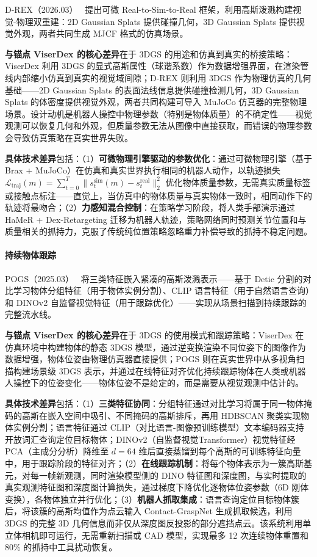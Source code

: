 D-REX（2026.03）~\cite{2603_01151} 提出可微 Real-to-Sim-to-Real 框架，利用高斯泼溅构建视觉-物理双重建：2D Gaussian Splats 提供碰撞几何，3D Gaussian Splats 提供视觉外观，两者共同生成 MJCF 格式的仿真场景。

\textbf{与锚点 ViserDex 的核心差异}在于 3DGS 的用途和仿真到真实的桥接策略：ViserDex 利用 3DGS 的显式高斯属性（球谐系数）作为数据增强界面，在渲染管线内部缩小仿真到真实的视觉域间隙；D-REX 则利用 3DGS 作为物理仿真的几何基础——2D Gaussian Splats 的表面法线信息提供碰撞检测几何，3D Gaussian Splats 的体密度提供视觉外观，两者共同构建可导入 MuJoCo 仿真器的完整物理场景。设计动机是机器人操控中物理参数（特别是物体质量）的不确定性——视觉观测可以恢复几何和外观，但质量参数无法从图像中直接获取，而错误的物理参数会导致仿真策略在真实世界失败。

\textbf{具体技术差异}包括：（1）\textbf{可微物理引擎驱动的参数优化}：通过可微物理引擎（基于 Brax + MuJoCo）在仿真和真实世界执行相同的机器人动作，以轨迹损失 $\mathcal{L}_\text{traj}(m) = \sum_{t=0}^T \|s_t^\text{sim}(m) - s_t^\text{real}\|_2^2$ 优化物体质量参数，无需真实质量标签或接触点标注——直觉上，当仿真中的物体质量与真实物体一致时，相同动作下的轨迹将最吻合；（2）\textbf{力感知混合控制}：在策略学习阶段，将人类手部演示通过 HaMeR + Dex-Retargeting 迁移为机器人轨迹，策略网络同时预测关节位置和与质量相关的抓持力，克服了传统纯位置策略忽略重力补偿导致的抓持不稳定问题。

\paragraph{持续物体跟踪}

POGS（2025.03）~\cite{2503_05189} 将三类特征嵌入紧凑的高斯泼溅表示——基于 Detic 分割的对比学习物体分组特征（用于物体实例分割）、CLIP 语言特征（用于自然语言查询）和 DINOv2 自监督视觉特征（用于跟踪优化）——实现从场景扫描到持续跟踪的完整流水线。

\textbf{与锚点 ViserDex 的核心差异}在于 3DGS 的使用模式和跟踪策略：ViserDex 在仿真环境中构建物体的静态 3DGS 模型，通过逆变换渲染不同位姿下的图像作为数据增强，物体位姿由物理仿真器直接提供；POGS 则在真实世界中从多视角扫描构建场景级 3DGS 表示，并通过在线特征对齐优化持续跟踪物体在人类或机器人操控下的位姿变化——物体位姿不是给定的，而是需要从视觉观测中估计的。

\textbf{具体技术差异}包括：（1）\textbf{三类特征协同}：分组特征通过对比学习将属于同一物体掩码的高斯在嵌入空间中吸引、不同掩码的高斯排斥，再用 HDBSCAN 聚类实现物体实例分割；语言特征通过 CLIP（对比语言-图像预训练模型）文本编码器支持开放词汇查询定位目标物体；DINOv2（自监督视觉Transformer）视觉特征经 PCA（主成分分析）降维至 $d=64$ 维后直接蒸馏到每个高斯的可训练特征向量中，用于跟踪阶段的特征对齐；（2）\textbf{在线跟踪机制}：将每个物体表示为一簇高斯基元，对每一帧新观测，同时渲染模型侧的 DINO 特征图和深度图，与实时提取的真实观测特征图和深度图计算损失，通过梯度下降优化逐物体位姿参数（6D 刚体变换），各物体独立并行优化；（3）\textbf{机器人抓取集成}：语言查询定位目标物体簇后，将该簇的高斯均值作为点云输入 Contact-GraspNet 生成抓取候选，利用 3DGS 的完整 3D 几何信息而非仅从深度图反投影的部分遮挡点云。该系统利用单立体相机即可运行，无需重新扫描或 CAD 模型，实现最多 12 次连续物体重置和 80\% 的抓持中工具扰动恢复。


